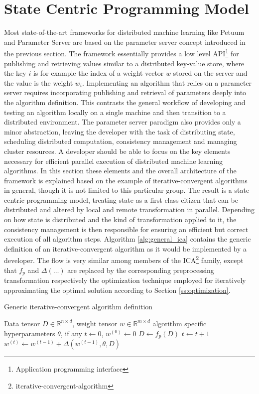 
\chapter{State Centric Programming Model}
\label{c:state_centric}
Most state-of-the-art frameworks for distributed machine learning like Petuum \cite{Xing2015} and Parameter Server \cite{Li2014} are based on the parameter server concept introduced in the previous section.
The framework essentially provides a low level API\footnote{Application programming interface} for publishing and retrieving values similar to a distributed key-value store, where the key $i$ is for example the index of a weight vector $w$ stored on the server and the value is the weight $w_i$.
Implementing an algorithm that relies on a parameter server requires incorporating publishing and retrieval of parameters deeply into the algorithm definition.
This contrasts the general workflow of developing and testing an algorithm locally on a single machine and then transition to a distributed environment.
The parameter server paradigm also provides only a minor abstraction, leaving the developer with the task of distributing state, scheduling distributed computation, consistency management and managing cluster resources.
A developer should be able to focus on the key elements necessary for efficient parallel execution of distributed machine learning algorithms.
In this section these elements and the overall architecture of the framework is explained based on the example of iterative-convergent algorithms in general, though it is not limited to this particular group.
The result is a state centric programming model, treating state as a first class citizen that can be distributed and altered by local and remote transformation in parallel.
Depending on how state is distributed and the kind of transformation applied to it, the consistency management is then responsible for ensuring an efficient but correct execution of all algorithm steps.
Algorithm \ref{alg:general_ica} contains the generic definition of an iterative-convergent algorithm as it would be implemented by a developer.
The flow is very similar among members of the ICA\footnote{iterative-convergent-algorithm} family, except that $f_p$ and $\Delta(\ldots)$ are replaced by the corresponding preprocessing transformation respectively the optimization technique employed for iteratively approximating the optimal solution according to Section \ref{ss:optimization}.
\begin{algorithm}
\caption{Generic iterative-convergent algorithm definition}\label{alg:general_ica}
\begin{algorithmic}[1]{}
\ALGSTATE Data tensor $D \in \mathbb{R}^{n \times d}$, weight tensor $w \in \mathbb{R}^{m \times d}$
\INPUT algorithm specific hyperparameters $\theta$, if any
\INIT $t \gets 0$, $w^{(0)} \gets 0$
\State $D \gets f_{p}(D)$ 
\Repeat {}
\State $t \gets t + 1$
\State $w^{(t)} \gets w^{(t-1)} + \Delta(w^{(t-1)}, \theta, D)$ 
 
\end{algorithmic}
\end{algorithm}
